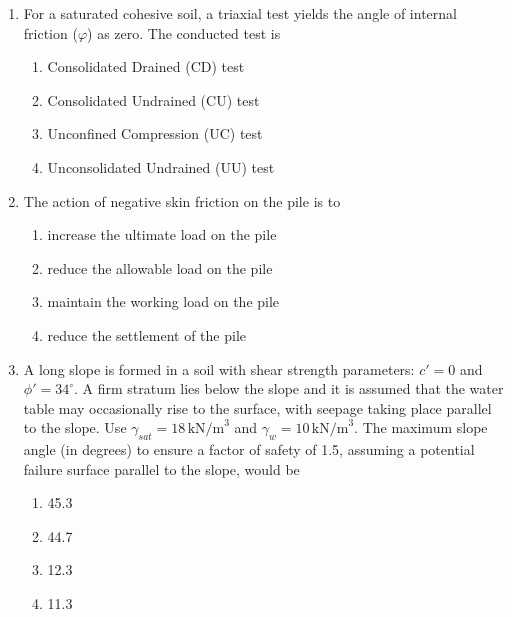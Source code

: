 \documentclass[journal,12pt,onecolumn]{IEEEtran}
\theoremstyle{remark}
\begin{document}
\begin{enumerate}
\item For a saturated cohesive soil, a triaxial test yields the angle of internal friction ($\varphi$) as zero. The conducted test is \hfill{}

\begin{multicols}{2}
\begin{enumerate}
\item Consolidated Drained (CD) test
\item Consolidated Undrained (CU) test
\item Unconfined Compression (UC) test
\item Unconsolidated Undrained (UU) test
\end{enumerate}
\end{multicols}

\item The action of negative skin friction on the pile is to \hfill{}

\begin{multicols}{2}
\begin{enumerate}
\item increase the ultimate load on the pile
\item reduce the allowable load on the pile
\item maintain the working load on the pile
\item reduce the settlement of the pile
\end{enumerate}
\end{multicols}

\item A long slope is formed in a soil with shear strength parameters: $c' = 0$ and $\phi' = 34^\circ$. A firm stratum lies below the slope and it is assumed that the water table may occasionally rise to the surface, with seepage taking place parallel to the slope. Use $\gamma_{sat} = 18\, \text{kN/m}^3$ and $\gamma_w = 10\, \text{kN/m}^3$. The maximum slope angle (in degrees) to ensure a factor of safety of 1.5, assuming a potential failure surface parallel to the slope, would be \hfill{}

\begin{multicols}{2}
\begin{enumerate}
\item 45.3
\item 44.7
\item 12.3
\item 11.3
\end{enumerate}
\end{multicols}


\end{enumerate}
\end{document}
